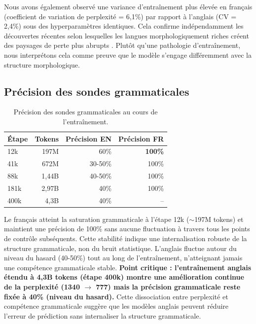 \documentclass[11pt,a4paper]{article}
\begin{document}
Nous avons également observé une variance d'entraînement plus élevée en français (coefficient de variation de perplexité = 6,1\%) par rapport à l'anglais (CV = 2,4\%) sous des hyperparamètres identiques. Cela confirme indépendamment les découvertes récentes selon lesquelles les langues morphologiquement riches créent des paysages de perte plus abrupts \citep{cohen2023spike}. Plutôt qu'une pathologie d'entraînement, nous interprétons cela comme preuve que le modèle s'engage différemment avec la structure morphologique.

\subsection{Précision des sondes grammaticales}

\begin{table}[H]
\centering
\begin{tabular}{lrrr}
\toprule
\textbf{Étape} & \textbf{Tokens} & \textbf{Précision EN} & \textbf{Précision FR} \\
\midrule
12k & 197M & 60\% & \textbf{100\%} \\
41k & 672M & 30-50\% & 100\% \\
88k & 1,44B & 40-50\% & 100\% \\
181k & 2,97B & 40\% & 100\% \\
400k & 4,3B & 40\% & -- \\
\bottomrule
\end{tabular}
\caption{Précision des sondes grammaticales au cours de l'entraînement.}
\label{tab:accuracy}
\end{table}

Le français atteint la saturation grammaticale à l'étape 12k ($\sim$197M tokens) et maintient une précision de 100\% sans aucune fluctuation à travers tous les points de contrôle subséquents. Cette stabilité indique une internalisation robuste de la structure grammaticale, non du bruit statistique. L'anglais fluctue autour du niveau du hasard (40-50\%) tout au long de l'entraînement, n'atteignant jamais une compétence grammaticale stable. \textbf{Point critique : l'entraînement anglais étendu à 4,3B tokens (étape 400k) montre une amélioration continue de la perplexité (1340 $\rightarrow$ 777) mais la précision grammaticale reste fixée à 40\% (niveau du hasard).} Cette dissociation entre perplexité et compétence grammaticale suggère que les modèles anglais peuvent réduire l'erreur de prédiction sans internaliser la structure grammaticale.
\end{document}
